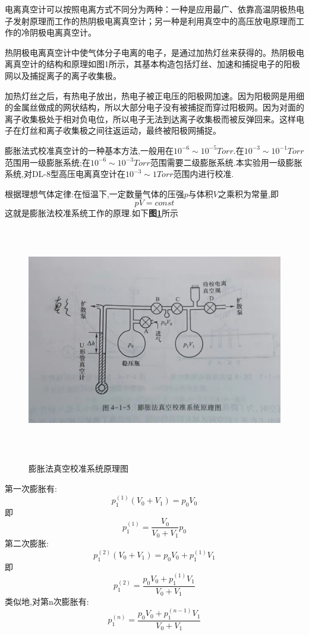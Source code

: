 \documentclass[a4paper]{article}
\begin{document}
电离真空计可以按照电离方式不同分为两种：一种是应用最广、依靠高温阴极热电子发射原理而工作的热阴极电离真空计；另一种是利用真空中的高压放电原理而工作的冷阴极电离真空计。

热阴极电离真空计中使气体分子电离的电子，是通过加热灯丝来获得的。热阴极电离真空计的结构和原理如图1所示，其基本构造包括灯丝、加速和捕捉电子的阳极网以及捕捉离子的离子收集极。

加热灯丝之后，有热电子放出，热电子被正电压的阳极网加速。因为阳极网是用细的金属丝做成的网状结构，所以大部分电子没有被捕捉而穿过阳极网。因为对面的离子收集极处于相对负电位，所以电子无法到达离子收集极而被反弹回来。这样电子在灯丝和离子收集极之间往返运动，最终被阳极网捕捉。

膨胀法式校准真空计的一种基本方法,一般用在$10^{-6}\sim10^{-5}\si{Torr}$.在$10^{-3}\sim10^{-1}\si{Torr}$范围用一级膨胀系统;在$10^{-6}\sim10^{-3}\si{Torr}$范围需要二级膨胀系统.本实验用一级膨胀系统,对DL-8型高压电离真空计在$10^{-3}\sim1\si{Torr}$范围内进行校准.

根据理想气体定律:在恒温下,一定数量气体的压强$p$与体积$V$之乘积为常量,即
\begin{equation}
    pV=const
\end{equation}
这就是膨胀法校准系统工作的原理.如下\textbf{图\ref{fig:fig1}}所示
\begin{figure}[H]
 \centering
 \caption{膨胀法真空校准系统原理图}
 \includegraphics[height=10cm, width=14cm]{images/pic1.jpg}
 \label{fig:fig1}
\end{figure}
第一次膨胀有:
\begin{equation}
    p_1^{(1)}(V_0+V_1)=p_0V_0
\end{equation}
即
\begin{equation}
    p_1^{(1)}=\frac{V_0}{V_0+V_1}p_0
\end{equation}
第二次膨胀:
\begin{equation}
    p_1^{(2)}(V_0+V_1)=p_0V_0+p_1^{(1)}V_1
\end{equation}
即
\begin{equation}
    p_1^{(2)}=\frac{p_0V_0+p_1^{(1)}V_1}{V_0+V_1}
\end{equation}
类似地,对第n次膨胀有:
\begin{equation}
    p_1^{(n)}=\frac{p_0V_0+p_1^{(n-1)}V_1}{V_0+V_1}
\end{equation}
\newpage
\end{document}
